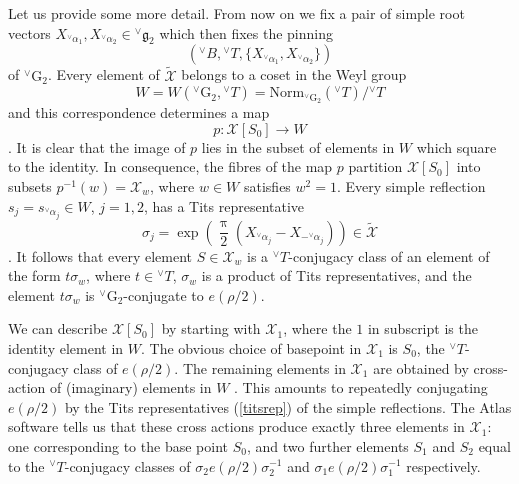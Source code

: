 \documentclass[a4paper, 11pt]{article}
\begin{document}
Let us provide some more detail.  From now on we fix a  pair of simple
root vectors   $X_{{^\vee}\alpha_{1}}, X_{{^\vee}\alpha_{2}}
\in {^\vee}\mathfrak{g}_{2}$ which then fixes the pinning
$$({^\vee}B, {^\vee}T, \{ X_{{^\vee}\alpha_{1}}, X_{{^\vee}\alpha_{2}}\})$$
of ${^\vee}\mathrm{G}_{2}$.  
Every
element of $\widetilde{\mathcal{X}}$ belongs to a coset in the Weyl group
$$W = W({^\vee}\mathrm{G}_{2}, {^\vee}T) =
\mathrm{Norm}_{{^\vee}\mathrm{G}_{2}}({^\vee}T)/ {^\vee}T$$ 
and this correspondence determines a map
$$p: \mathcal{X}[S_{0}] \rightarrow W$$
\cite[(9.11i)]{Adams-Fokko}. It is clear that the image of $p$ lies in
the subset of elements in $W$ which square to the identity.   In
consequence, the fibres of the map 
$p$ partition $\mathcal{X}[S_{0}]$ into subsets
$p^{-1}(w) = \mathcal{X}_{w}$, where $w \in W$ satisfies $w^{2} = 1$. Every
simple reflection $s_{j} = s_{{^\vee}\alpha_{j}} 
\in W$, $j=1,2$,  has a Tits representative 
\begin{equation}
\label{titsrep}
\sigma_{j} =  \exp\left( \frac{\uppi}{2} (X_{{^\vee}\alpha_{j}} -
X_{-{^\vee}\alpha_{j}} )  \right)\in
\widetilde{\mathcal{X}}
\end{equation}
\cite[Section 12]{AVParameters}.  It follows that every element $S \in \mathcal{X}_{w}$ is a
${^\vee}T$-conjugacy class of an 
element of the form $t \sigma_{w}$, where $t \in {^\vee}T$,
$\sigma_{w}$ is a product of Tits representatives, and the
element $t \sigma_{w}$ is 
${^\vee}\mathrm{G}_{2}$-conjugate to $e(\rho/2)$. 


We can describe $\mathcal{X}[S_{0}]$ by starting with
$\mathcal{X}_{1}$, where the $1$ in subscript is the identity element in
$W$.  The obvious choice of basepoint in $\mathcal{X}_{1}$ is $S_{0}$, the
${^\vee}T$-conjugacy class of 
$e(\rho/2)$.  The remaining elements in $\mathcal{X}_{1}$ are obtained by
cross-action of (imaginary) elements in $W$
\cite[(12.17)]{Adams-Fokko}.  This 
amounts to repeatedly conjugating $e(\rho/2)$ by the Tits representatives
(\ref{titsrep}) of the simple reflections.  The Atlas software tells
us that these cross actions produce exactly three elements in
$\mathcal{X}_{1}$: one 
corresponding to the base point $S_{0}$, and two further elements
$S_{1}$ and $S_{2}$ equal to the ${^\vee}T$-conjugacy classes of  
$\sigma_{2} e(\rho/2) \sigma_{2}^{-1}$ and  $\sigma_{1} e(\rho/2)
\sigma_{1}^{-1}$ respectively.  
\end{document}
